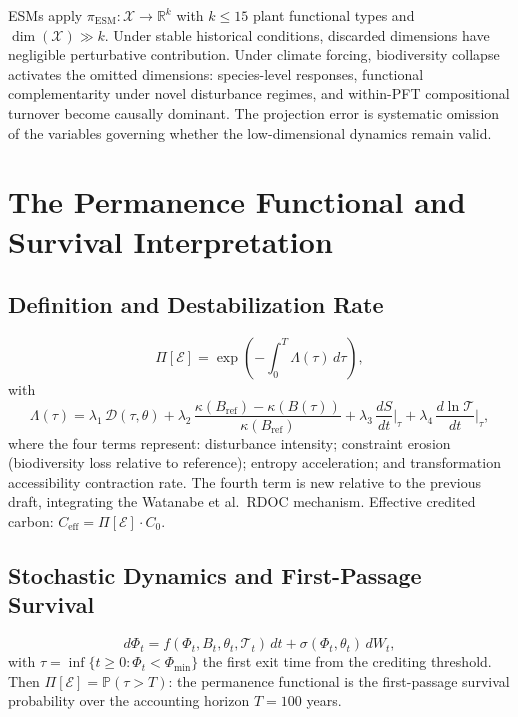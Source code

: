 \documentclass[12pt]{article}
\newcommand{\Ecal}{\mathcal{E}}
\newcommand{\Xcal}{\mathcal{X}}
\newcommand{\Tcal}{\mathcal{T}}
\newcommand{\R}{\mathbb{R}}
\newcommand{\kref}{\kappa(B_{\mathrm{ref}})}
\newcommand{\ktau}{\kappa(B(\tau))}
\begin{document}
ESMs apply $\pi_\text{ESM}:\Xcal\to\R^k$ with $k\leq 15$ plant functional types and
$\dim(\Xcal)\gg k$. Under stable historical conditions, discarded dimensions have
negligible perturbative contribution. Under climate forcing, biodiversity collapse
activates the omitted dimensions: species-level responses, functional complementarity
under novel disturbance regimes, and within-PFT compositional turnover become causally
dominant. The projection error is systematic omission of the variables governing whether
the low-dimensional dynamics remain valid.

\section{The Permanence Functional and Survival Interpretation}

\subsection{Definition and Destabilization Rate}

\begin{equation}
\label{eq:permanence-functional}
\Pi[\Ecal]
= \exp\!\left(-\int_0^T \Lambda(\tau)\,d\tau\right),
\end{equation}
with
\begin{equation}
\label{eq:lambda}
\Lambda(\tau)
= \lambda_1\,\mathcal{D}(\tau,\theta)
+ \lambda_2\,\frac{\kref-\ktau}{\kref}
+ \lambda_3\,\frac{dS}{dt}\bigg|_\tau
+ \lambda_4\,\frac{d\ln\Tcal}{dt}\bigg|_\tau,
\end{equation}
where the four terms represent: disturbance intensity; constraint erosion (biodiversity
loss relative to reference); entropy acceleration; and transformation accessibility
contraction rate. The fourth term is new relative to the previous draft, integrating the
Watanabe et al.\ RDOC mechanism. Effective credited carbon: $C_\text{eff}=\Pi[\Ecal]\cdot
C_0$.

\subsection{Stochastic Dynamics and First-Passage Survival}

\begin{equation}
\label{eq:sde}
d\Phi_t = f(\Phi_t, B_t, \theta_t, \Tcal_t)\,dt + \sigma(\Phi_t,\theta_t)\,dW_t,
\end{equation}
with $\tau = \inf\{t\geq 0:\Phi_t<\Phi_{\min}\}$ the first exit time from the
crediting threshold. Then $\Pi[\Ecal]=\mathbb{P}(\tau>T)$: the permanence functional is
the first-passage survival probability over the accounting horizon $T=100$ years.
\end{document}
